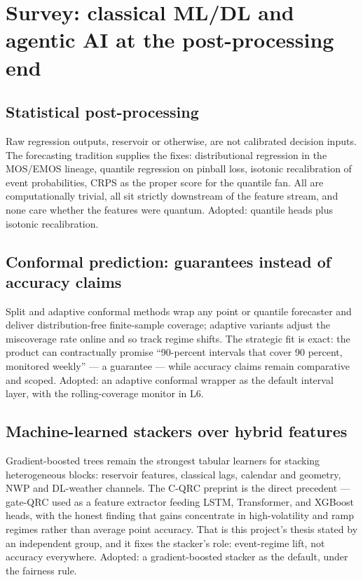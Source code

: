 \section{Survey: classical ML/DL and agentic AI at the post-processing end}
\label{sec:prod-survey}

\subsection{Statistical post-processing}
Raw regression outputs, reservoir or otherwise, are not calibrated decision
inputs. The forecasting tradition supplies the fixes: distributional
regression in the MOS/EMOS lineage, quantile regression on pinball loss,
isotonic recalibration of event probabilities, CRPS as the proper score for
the quantile fan. All are computationally trivial, all sit strictly
downstream of the feature stream, and none care whether the features were
quantum. Adopted: quantile heads plus isotonic recalibration.

\subsection{Conformal prediction: guarantees instead of accuracy claims}
Split and adaptive conformal methods wrap any point or quantile forecaster
and deliver distribution-free finite-sample coverage; adaptive variants
adjust the miscoverage rate online and so track regime shifts. The
strategic fit is exact: the product can contractually promise
``90-percent intervals that cover 90 percent, monitored weekly'' --- a
guarantee --- while accuracy claims remain comparative and scoped.
Adopted: an adaptive conformal wrapper as the default interval layer, with
the rolling-coverage monitor in L6.

\subsection{Machine-learned stackers over hybrid features}
Gradient-boosted trees remain the strongest tabular learners for stacking
heterogeneous blocks: reservoir features, classical lags, calendar and
geometry, NWP and DL-weather channels. The C-QRC preprint is the direct
precedent --- gate-QRC used as a feature extractor feeding LSTM,
Transformer, and XGBoost heads, with the honest finding that gains
concentrate in high-volatility and ramp regimes rather than average point
accuracy. That is this project's thesis stated by an independent group, and
it fixes the stacker's role: event-regime lift, not accuracy everywhere.
Adopted: a gradient-boosted stacker as the default, under the fairness
rule.

